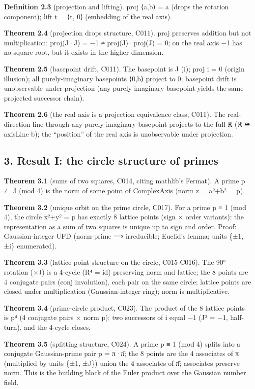 \documentclass[
]{article}
\begin{document}
\textbf{Definition 2.3} (projection and lifting). proj ⟨a,b⟩ = a (drops
the rotation component); lift t = ⟨t, 0⟩ (embedding of the real axis).

\textbf{Theorem 2.4} (projection drops structure, C011). proj preserves
addition but not multiplication: proj(J·J) = −1 ≠ proj(J)·proj(J) = 0;
on the real axis −1 has no square root, but it exists in the higher
dimension.

\textbf{Theorem 2.5} (basepoint drift, C011). The basepoint is J (i);
proj i = 0 (origin illusion); all purely-imaginary basepoints ⟨0,b⟩
project to 0; basepoint drift is unobservable under projection (any
purely-imaginary basepoint yields the same projected successor chain).

\textbf{Theorem 2.6} (the real axis is a projection equivalence class,
C011). The real-direction line through any purely-imaginary basepoint
projects to the full ℝ (ℝ ≅ axisLine b); the ``position'' of the real
axis is unobservable under projection.

\subsection{3. Result I: the circle structure of
primes}\label{result-i-the-circle-structure-of-primes}

\textbf{Theorem 3.1} (sums of two squares, C014, citing mathlib's
Fermat). A prime p ≢ 3 (mod 4) is the norm of some point of ComplexAxis
(norm z = a²+b² = p).

\textbf{Theorem 3.2} (unique orbit on the prime circle, C017). For a
prime p ≡ 1 (mod 4), the circle x²+y² = p has exactly 8 lattice points
(sign × order variants): the representation as a sum of two squares is
unique up to sign and order. Proof: Gaussian-integer UFD (norm-prime ⟹
irreducible; Euclid's lemma; units \{±1, ±i\} enumerated).

\textbf{Theorem 3.3} (lattice-point structure on the circle, C015-C016).
The 90° rotation (×J) is a 4-cycle (R⁴ = id) preserving norm and
lattice; the 8 points are 4 conjugate pairs (conj involution), each pair
on the same circle; lattice points are closed under multiplication
(Gaussian-integer ring); norm is multiplicative.

\textbf{Theorem 3.4} (prime-circle product, C023). The product of the 8
lattice points is p⁴ (4 conjugate pairs × norm p); two successors of i
equal −1 (J² = −1, half-turn), and the 4-cycle closes.

\textbf{Theorem 3.5} (splitting structure, C024). A prime p ≡ 1 (mod 4)
splits into a conjugate Gaussian-prime pair p = π·π̄; the 8 points are
the 4 associates of π (multiplied by units \{±1, ±J\}) union the 4
associates of π̄; associates preserve norm. This is the building block of
the Euler product over the Gaussian number field.
\end{document}

